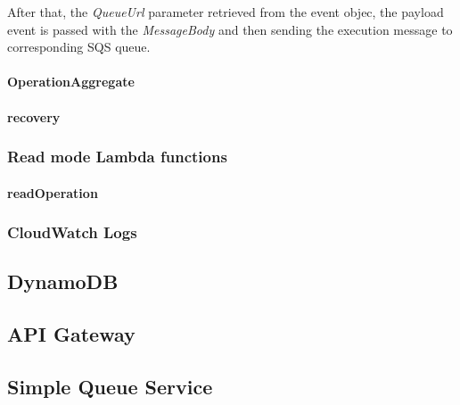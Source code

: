 After that, the \emph{QueueUrl} parameter retrieved from the event objec, the payload event is passed with the \emph{MessageBody} and then sending the execution message to corresponding SQS queue. 

\paragraph{OperationAggregate}


\paragraph{recovery}

\subsubsection{Read mode Lambda functions}
\paragraph{readOperation}


\subsubsection{CloudWatch Logs}


\subsection{DynamoDB}

\subsection{API Gateway}

\subsection{Simple Queue Service}
